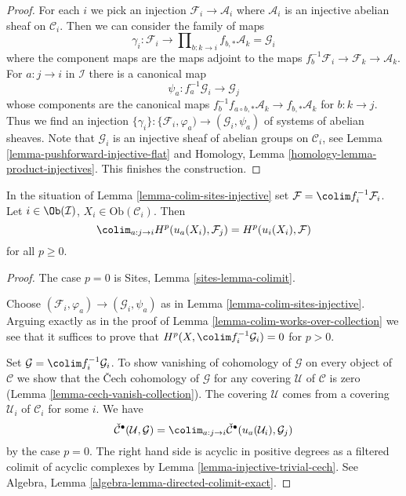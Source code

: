 \begin{proof}
For each $i$ we pick an injection $\mathcal{F}_i \to \mathcal{A}_i$
where $\mathcal{A}_i$ is an injective abelian sheaf on $\mathcal{C}_i$.
Then we can consider the family of maps
$$
\gamma_i :
\mathcal{F}_i
\longrightarrow
\prod\nolimits_{b : k \to i} f_{b, *}\mathcal{A}_k = \mathcal{G}_i
$$
where the component maps are the maps adjoint to the maps
$f_b^{-1}\mathcal{F}_i \to \mathcal{F}_k \to \mathcal{A}_k$.
For $a : j \to i$ in $\mathcal{I}$ there is a canonical map
$$
\psi_a : f_a^{-1}\mathcal{G}_i \to \mathcal{G}_j
$$
whose components are the canonical maps
$f_b^{-1}f_{a \circ b, *}\mathcal{A}_k \to f_{b, *}\mathcal{A}_k$
for $b : k \to j$. Thus we find an injection
$\{\gamma_i\} : \{\mathcal{F}_i, \varphi_a) \to (\mathcal{G}_i, \psi_a)$
of systems of abelian sheaves. Note that $\mathcal{G}_i$ is an injective
sheaf of abelian groups on $\mathcal{C}_i$, see
Lemma \ref{lemma-pushforward-injective-flat} and
Homology, Lemma \ref{homology-lemma-product-injectives}.
This finishes the construction.
\end{proof}

\begin{lemma}
\label{lemma-colimit}
In the situation of Lemma \ref{lemma-colim-sites-injective} set
$\mathcal{F} = \colim f_i^{-1}\mathcal{F}_i$.
Let $i \in \Ob(\mathcal{I})$, $X_i \in \text{Ob}(\mathcal{C}_i)$. Then
$$
\colim_{a : j \to i} H^p(u_a(X_i), \mathcal{F}_j) =
H^p(u_i(X_i), \mathcal{F})
$$
for all $p \geq 0$.
\end{lemma}

\begin{proof}
The case $p = 0$ is Sites, Lemma \ref{sites-lemma-colimit}.

\medskip\noindent
Choose $(\mathcal{F}_i, \varphi_a) \to (\mathcal{G}_i, \psi_a)$
as in Lemma \ref{lemma-colim-sites-injective}.
Arguing exactly as in the proof of
Lemma \ref{lemma-colim-works-over-collection}
we see that it suffices to prove that
$H^p(X, \colim f_i^{-1}\mathcal{G}_i) = 0$ for $p > 0$.

\medskip\noindent
Set $\mathcal{G} = \colim f_i^{-1}\mathcal{G}_i$.
To show vanishing of cohomology of $\mathcal{G}$ on every object
of $\mathcal{C}$ we show that the {\v C}ech cohomology of $\mathcal{G}$
for any covering $\mathcal{U}$ of $\mathcal{C}$ is zero
(Lemma \ref{lemma-cech-vanish-collection}).
The covering $\mathcal{U}$ comes from a covering
$\mathcal{U}_i$ of $\mathcal{C}_i$ for some $i$. We have
$$
\check{\mathcal{C}}^\bullet(\mathcal{U}, \mathcal{G}) =
\colim_{a : j \to i}
\check{\mathcal{C}}^\bullet(u_a(\mathcal{U}_i), \mathcal{G}_j)
$$
by the case $p = 0$. The right hand side is acyclic in positive degrees
as a filtered colimit of acyclic complexes by
Lemma \ref{lemma-injective-trivial-cech}. See
Algebra, Lemma \ref{algebra-lemma-directed-colimit-exact}.
\end{proof}















